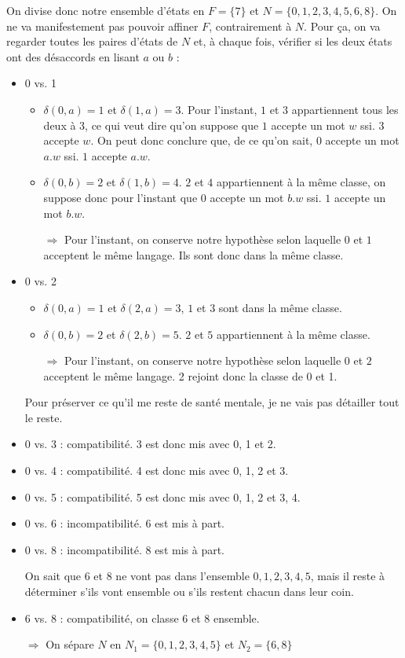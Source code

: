 \begin{correction*}


On divise donc notre ensemble d'états en $F = \{7\}$ et $N = \{0,1,2,3,4,5,6,8\}$. On ne va manifestement pas pouvoir affiner $F$, contrairement à $N$. Pour ça, on va regarder toutes les paires d'états de $N$ et, à chaque fois, vérifier si les deux états ont des désaccords en lisant $a$ ou $b$ :

\begin{itemize}
\item 0 vs. 1
\begin{itemize}
\item $\delta(0,a) = 1$ et $\delta(1,a) = 3$. Pour l'instant, $1$ et $3$ appartiennent tous les deux à $3$, ce qui veut dire qu'on suppose que $1$ accepte un mot $w$ ssi. $3$ accepte $w$. On peut donc conclure que, de ce qu'on sait, $0$ accepte un mot $a.w$ ssi. $1$ accepte $a.w$.
\item $\delta(0,b) = 2$ et $\delta(1,b) = 4$. $2$ et $4$ appartiennent à la même classe, on suppose donc pour l'instant que $0$ accepte un mot $b.w$ ssi. $1$ accepte un mot $b.w$.
\item[$\Rightarrow$] Pour l'instant, on conserve notre hypothèse selon laquelle $0$ et $1$ acceptent le même langage. Ils sont donc dans la même classe.
\end{itemize}
\item 0 vs. 2
\begin{itemize}
\item $\delta(0,a) = 1$ et $\delta(2,a) = 3$, $1$ et $3$ sont dans la même classe.
\item $\delta(0,b) = 2$ et $\delta(2,b) = 5$. $2$ et $5$ appartiennent à la même classe.
\item[$\Rightarrow$] Pour l'instant, on conserve notre hypothèse selon laquelle $0$ et $2$ acceptent le même langage. 2 rejoint donc la classe de 0 et 1.
\end{itemize}
\item[] Pour préserver ce qu'il me reste de santé mentale, je ne vais pas détailler tout le reste.
\item 0 vs. 3 : compatibilité. 3 est donc mis avec 0, 1 et 2.
\item 0 vs. 4 : compatibilité. 4 est donc mis avec 0, 1, 2 et 3.
\item 0 vs. 5 : compatibilité. 5 est donc mis avec 0, 1, 2 et 3, 4.
\item 0 vs. 6 : incompatibilité. 6 est mis à part.
\item 0 vs. 8 : incompatibilité. 8 est mis à part.
\item[] On sait que 6 et 8 ne vont pas dans l'ensemble $0,1,2,3,4,5$, mais il reste à déterminer s'ils vont ensemble ou s'ils restent chacun dans leur coin.
\item 6 vs. 8 : compatibilité, on classe $6$ et $8$ ensemble.
\item[$\Rightarrow$] On sépare $N$ en $N_1 = \{0,1,2,3,4,5\}$ et $N_2 = \{6,8\}$
\end{itemize}


\end{correction*}
